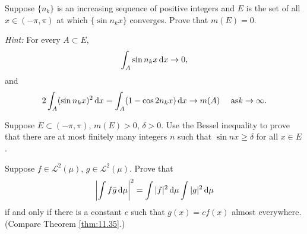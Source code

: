 \begin{myexercise}
    \label{ex:11.16}
    Suppose $\{n_k\}$ is an increasing sequence of positive integers
    and $E$ is the set of all $x \in (-\pi, \pi)$ at which $\{\sin n_kx\}$ converges.
    Prove that $m(E) = 0$.

    \emph{Hint:} For every $A \subset E$,
    \begin{equation*}
        \int_A \sin n_k x \d x \rightarrow 0,
    \end{equation*}
    and
    \begin{equation*}
        2\int_A (\sin n_k x)^2 \d x =
        \int_A (1 - \cos 2 n_k x) \d x \rightarrow m(A)
        \quad
        \text{ as} k \rightarrow \infty .
    \end{equation*}
\end{myexercise}


\begin{myexercise}
    \label{ex:11.17}
    Suppose $E \subset (-\pi, \pi)$, $m(E) > 0$, $\delta > 0$.
    Use the Bessel inequality to prove that there are at most finitely many integers $n$ such that $\sin n x \geq \delta$ for all $x \in E$.
\end{myexercise}


\begin{myexercise}
    \label{ex:11.18}
    Suppose
    $f \in \mathscr{L}^2 (\mu)$,
    $g \in \mathscr{L}^2 (\mu)$.
    Prove that
    \begin{equation*}
        \left| \int f \bar{g} \d \mu \right|^2 =
        \int |f|^2 \d \mu
        \int |g|^2 \d \mu
    \end{equation*}
    if and only if there is a constant $c$ such that $g(x) = cf(x)$ almost everywhere.
    (Compare Theorem \ref{thm:11.35}.)
\end{myexercise}

